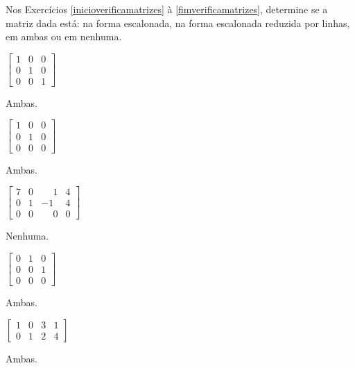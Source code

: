 \documentclass[12pt]{exam}
\begin{document}
Nos Exercícios \ref{inicioverificamatrizes} à \ref{fimverificamatrizes}, determine se a matriz dada está: na forma escalonada, na forma escalonada reduzida por linhas, em ambas ou em nenhuma.

\begin{multicols}{2}
    \begin{exercicio}\label{inicioverificamatrizes}
        $\begin{bmatrix}1 & 0 & 0\\0 & 1 & 0\\0 & 0 & 1\end{bmatrix}$
        \begin{solucao}
            Ambas.
        \end{solucao}
    \end{exercicio}

    \begin{exercicio}
        $\begin{bmatrix}1 & 0 & 0\\0 & 1 & 0\\0 & 0 & 0\end{bmatrix}$
        \begin{solucao}
            Ambas.
        \end{solucao}
    \end{exercicio}

    \begin{exercicio}
        $\begin{bmatrix}7 & 0 & \phantom{-} 1 & 4\\0 & 1 & -1 & 4\\0 & 0 & \phantom{-} 0 & 0\end{bmatrix}$
        \begin{solucao}
            Nenhuma.
        \end{solucao}
    \end{exercicio}

    \begin{exercicio}
        $\begin{bmatrix}0 & 1 & 0\\0 & 0 & 1\\0 & 0 & 0\end{bmatrix}$
        \begin{solucao}
            Ambas.
        \end{solucao}
    \end{exercicio}

    \begin{exercicio}
        $\begin{bmatrix}1 & 0 & 3 & 1\\0 & 1 & 2 & 4\end{bmatrix}$
        \begin{solucao}
            Ambas.
        \end{solucao}
    \end{exercicio}


\end{multicols}
\end{document}
